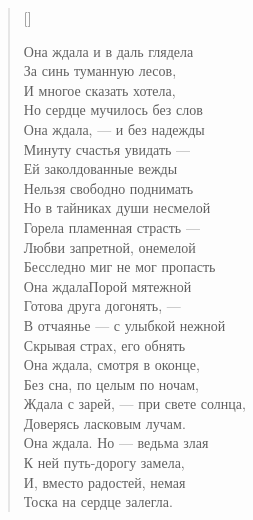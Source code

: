 \settowidth{\versewidth}{Она ждала и в даль глядела}
\begin{verse}[\versewidth]
\begin{altverse}
Она ждала и в даль глядела\\
    За синь туманную лесов,\\
И многое сказать хотела,\\
    Но сердце мучилось без слов\ldotst\\
Она ждала, --- и без надежды\\
    Минуту счастья увидать ---\\
Ей заколдованные вежды\\
    Нельзя свободно поднимать\ldotst\\
Но в тайниках души несмелой\\
    Горела пламенная страсть ---\\
Любви запретной, онемелой\\
    Бесследно миг не мог пропасть\ldotst\\
Она ждала\ldotst Порой мятежной\\
    Готова друга догонять, ---\\
В отчаянье --- с улыбкой нежной\\
    Скрывая страх, его обнять\ldotst\\
Она ждала, смотря в оконце,\\
    Без сна, по целым по ночам,\\
Ждала с зарей, --- при свете солнца,\\
    Доверясь ласковым лучам.\\
Она ждала. Но --- ведьма злая\\
    К ней путь-дорогу замела,\\
И, вместо радостей, немая\\
    Тоска на сердце залегла.
\end{altverse}
\end{verse}

\newpage
\vspace*{0cm}


